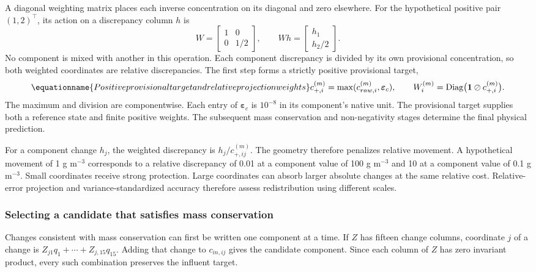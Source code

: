 A diagonal weighting matrix places each inverse concentration on its diagonal and zero elsewhere. For the hypothetical positive pair $(1,2)^\top$, its action on a discrepancy column $h$ is
\[
W=\begin{bmatrix}1&0\\0&1/2\end{bmatrix},\qquad
Wh=\begin{bmatrix}h_1\\h_2/2\end{bmatrix}.
\]
No component is mixed with another in this operation. Each component discrepancy is divided by its own provisional concentration, so both weighted coordinates are relative discrepancies. The first step forms a strictly positive provisional target,
\begin{equation}
\equationname{Positive provisional target and relative projection weights}
c_{+,i}^{(m)}=\max(c_{raw,i}^{(m)},\boldsymbol{\varepsilon}_c),\qquad
W_i^{(m)}=\operatorname{Diag}\bigl(\mathbf{1}\oslash c_{+,i}^{(m)}\bigr).
\label{eq:projection_positive_target}
\end{equation}
The maximum and division are componentwise. Each entry of $\boldsymbol{\varepsilon}_c$ is $10^{-8}$ in its component's native unit. The provisional target supplies both a reference state and finite positive weights. The subsequent mass conservation and non-negativity stages determine the final physical prediction.

For a component change $h_j$, the weighted discrepancy is $h_j/c_{+,ij}^{(m)}$. The geometry therefore penalizes relative movement. A hypothetical movement of 1 g m$^{-3}$ corresponds to a relative discrepancy of 0.01 at a component value of 100 g m$^{-3}$ and 10 at a component value of 0.1 g m$^{-3}$. Small coordinates receive strong protection. Large coordinates can absorb larger absolute changes at the same relative cost. Relative-error projection and variance-standardized accuracy therefore assess redistribution using different scales.

\subsubsection{Selecting a candidate that satisfies mass conservation}

Changes consistent with mass conservation can first be written one component at a time. If $Z$ has fifteen change columns, coordinate $j$ of a change is $Z_{j1}q_1+\cdots+Z_{j,15}q_{15}$. Adding that change to $c_{in,ij}$ gives the candidate component. Since each column of $Z$ has zero invariant product, every such combination preserves the influent target.

